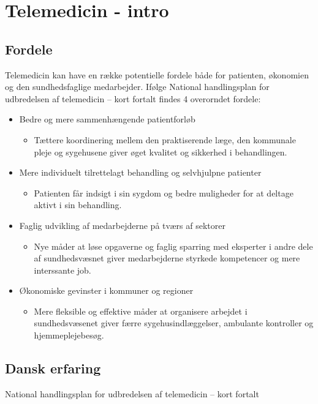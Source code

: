 \section{Telemedicin - intro}

\subsection{Fordele}
Telemedicin kan have en række potentielle fordele både for patienten, økonomien og den sundhedsfaglige medarbejder. Ifølge \textquotedbl National handlingsplan for udbredelsen af telemedicin – kort fortalt\textquotedbl \cite{Regeringen2012} findes 4 overorndet fordele:

\begin{itemize} 
	\item Bedre og mere sammenhængende patientforløb
		\begin{itemize} 

			\item Tættere koordinering mellem den praktiserende læge, den kommunale pleje og sygehusene giver øget kvalitet og sikkerhed i behandlingen.

		\end{itemize} 

	\item Mere individuelt tilrettelagt behandling og selvhjulpne patienter
		\begin{itemize} 

			\item Patienten får indsigt i sin sygdom og bedre muligheder for at deltage aktivt i sin behandling.

		\end{itemize} 

	\item Faglig udvikling af medarbejderne på tværs af sektorer
		\begin{itemize} 

			\item Nye måder at løse opgaverne og faglig sparring med eksperter i andre dele af sundhedsvæsnet giver medarbejderne styrkede kompetencer og mere interssante job.

		\end{itemize} 

	\item Økonomiske gevinster i kommuner og regioner
		\begin{itemize} 

			\item Mere fleksible og effektive måder at organisere arbejdet i sundhedsvæsenet giver færre sygehusindlæggelser, ambulante kontroller og hjemmeplejebesøg.

		\end{itemize} 	
\end{itemize} 

\subsection{Dansk erfaring}
	National handlingsplan for udbredelsen af telemedicin – kort fortalt
 
